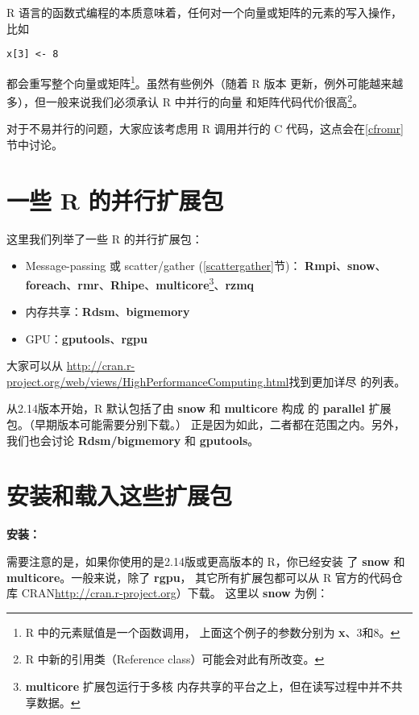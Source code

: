 R 语言的函数式编程的本质意味着，任何对一个向量或矩阵的元素的写入操作，
比如
\begin{lstlisting}
x[3] <- 8
\end{lstlisting}
都会重写整个向量或矩阵\footnote{R 中的元素赋值是一个函数调用，
上面这个例子的参数分别为 {\bf x}、3和8。}。虽然有些例外（随着 R 版本
更新，例外可能越来越多），但一般来说我们必须承认 R 中并行的向量
和矩阵代码代价很高\footnote{R 中新的引用类（Reference class）可能会对此有所改变。}。

对于不易并行的问题，大家应该考虑用 R 调用并行的 C 代码，这点会在\ref{cfromr}
节中讨论。

\section{一些 R 的并行扩展包}

这里我们列举了一些 R 的并行扩展包：

\begin{itemize}

\item Message-passing 或 scatter/gather (\ref{scattergather}节)：
{\bf Rmpi}、{\bf snow}、{\bf foreach}、{\bf rmr}、{\bf Rhipe}、{\bf multicore}\footnote{{\bf multicore} 扩展包运行于多核
内存共享的平台之上，但在读写过程中并不共享数据。}、{\bf rzmq}

\item 内存共享：{\bf Rdsm}、{\bf bigmemory}

\item GPU：{\bf gputools}、{\bf rgpu}

\end{itemize}

大家可以从
\url{http://cran.r-project.org/web/views/HighPerformanceComputing.html}找到更加详尽
的列表。

从2.14版本开始，R 默认包括了由 {\bf snow} 和 {\bf multicore} 构成
的 {\bf parallel} 扩展包。（早期版本可能需要分别下载。）
正是因为如此，二者都在范围之内。另外，我们也会讨论
{\bf Rdsm/bigmemory} 和 {\bf gputools}。

\section{安装和载入这些扩展包}

{\bf 安装：}

需要注意的是，如果你使用的是2.14版或更高版本的 R，你已经安装
了 {\bf snow} 和 {\bf multicore}。一般来说，除了 {\bf rgpu}，
其它所有扩展包都可以从 R 官方的代码仓库 CRAN\url{http://cran.r-project.org}）下载。
这里以 {\bf snow} 为例：

